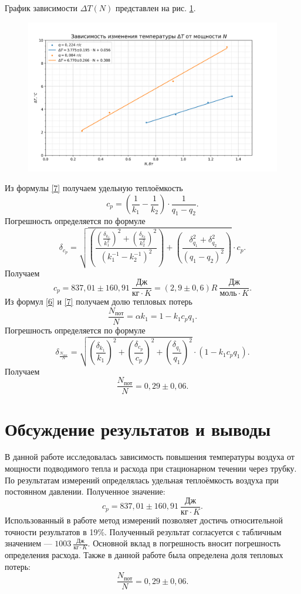 \documentclass[a4paper, 12pt]{article}
\begin{document}
График зависимости $\Delta{T}(N)$ представлен на рис. \ref{ris3}.
\begin{figure}[h!]
\begin{flushleft}
    \includegraphics[scale=0.75]{2.1.1.png}
\end{flushleft}
\caption{}
\label{ris3}
\end{figure}

Из формулы \eqref{7} получаем удельную теплоёмкость $$c_p = \left(\frac{1}{k_1} - \frac{1}{k_2}\right) \cdot \frac{1}{q_1 - q_2}.$$
Погрешность определяется по формуле $$\delta_{c_p} = \sqrt{\left(\frac{\left(\frac{\delta_{k_1}}{k_1^2}\right)^2 + \left(\frac{\delta_{k_2}}{k_2^2}\right)^2}{(k_1^{-1} - k_2^{-1})^2}\right) + \left(\frac{\delta_{q_1}^2 + \delta_{q_2}^2}{(q_1 - q_2)^2}\right)} \cdot c_p.$$ 
Получаем $$\boxed{c_p = 837,01\pm160,91~\frac{Дж}{кг \cdot K} = (2,9\pm0,6)R~\frac{Дж}{моль \cdot K}}.$$
Из формул \eqref{6} и \eqref{7} получаем долю тепловых потерь $$\frac{N_{пот}}{N} = \alpha k_1 = 1 - k_1 c_p q_1.$$
Погрешность определяется по формуле $$\delta_{\frac{N_{пот}}{N}} = \sqrt{\left(\frac{\delta_{k_1}}{k_1}\right)^2 + \left(\frac{\delta_{c_p}}{c_p}\right)^2 + \left(\frac{\delta_{q_1}}{q_1}\right)^2} \cdot (1 - k_1 c_p q_1).$$ 
Получаем $$\boxed{\frac{N_{пот}}{N} = 0,29\pm0,06}.$$

\section{Обсуждение результатов и выводы}

В данной работе исследовалась зависимость повышения температуры воздуха от мощности подводимого тепла и расхода при стационарном течении через трубку. По результатам измерений определялась удельная теплоёмкость воздуха при постоянном давлении. Полученное значение:
$$\boxed{c_p = 837,01\pm160,91~\frac{Дж}{кг \cdot K}}.$$
Использованный в работе метод измерений позволяет достичь относительной точности результатов в 19\%. Полученный результат согласуется с табличным значением --- $1003~\frac{Дж}{кг \cdot K}$. Основной вклад в погрешность вносит погрешность определения расхода.
Также в данной работе была определена доля тепловых потерь:
$$\boxed{\frac{N_{пот}}{N} = 0,29\pm0,06}.$$
\end{document}
